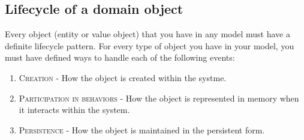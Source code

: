 \documentclass[a4paper,12pt]{article}
\begin{document}
\subsection{Lifecycle of a domain object}
Every object (entity or value object) that you have in any model must have a definite lifecycle pattern. For every type of object you have in your model, you must have defined ways to handle each of the following events:
\begin{enumerate}
\item \textsc{Creation} - How the object is created within the systme.
\item \textsc{Participation in behaviors} - How the object is represented in memory when it interacts within the system.
\item \textsc{Persistence} - How the object is maintained in the persistent form.
\end{enumerate}
\end{document}
